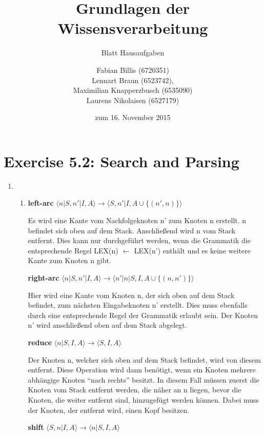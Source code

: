 \documentclass[a4paper]{scrartcl}
\title{Grundlagen der Wissensverarbeitung}
\subtitle{Blatt {\blattnr} Hausaufgaben}
\author{
    Fabian Billis (6720351) \\
    Lennart Braun (6523742), \\
    Maximilian Knapperzbusch (6535090) \\
    Laurens Nikolaisen (6527179) \\
}
\date{zum 16. November 2015}
\def \blattnr {5}
\begin{document}
\maketitle

\section*{Exercise \blattnr.2: Search and Parsing}

\begin{enumerate}
    \item
        \begin{enumerate}[label=(\alph*)]
            \item
            
            {
            
            \textbf{left-arc}   $\langle n|S,n'|I,A\rangle \rightarrow \langle S,n'|I,A \cup \{(n',n)\}\rangle$
            
            Es wird eine Kante vom Nachfolgeknoten n' zum Knoten n erstellt. n befindet sich oben auf dem Stack.
            Anschließend wird n vom Stack entfernt. Dies kann nur durchgeführt werden, wenn die Grammatik die entsprechende Regel LEX(n) $\leftarrow$ LEX(n') enthält und es keine weitere Kante zum Knoten n gibt. 
            
            \textbf{right-arc} $\langle n |S, n' | I, A \rangle \rightarrow \langle n'|n|S, I, A \cup \{(n, n')\}\rangle$ 
            
            
            Hier wird eine Kante vom Knoten n, der sich oben auf dem Stack befindet, zum nächsten Eingabeknoten n' erstellt.
            Dies muss ebenfalls durch eine entsprechende Regel der Grammatik erlaubt sein. Der Knoten n' wird anschließend oben auf dem Stack abgelegt.
            
            \textbf{reduce} $\langle n|S,I,A\rangle \rightarrow \langle S,I,A \rangle$
            
            Der Knoten n, welcher sich oben auf dem Stack befindet, wird von diesem entfernt. Diese Operation wird dann benötigt, wenn ein Knoten mehrere abhängige Knoten "`nach rechts"' besitzt. In diesem Fall müssen zuerst die Knoten vom Stack entfernt werden, die näher an n liegen, bevor die Knoten, die weiter entfernt sind, hinzugefügt werden können. Dabei muss der Knoten, der entfernt wird, einen Kopf besitzen.
            
            \textbf{shift} $\langle S,n|I,A\rangle \rightarrow \langle n|S,I,A \rangle$
            
}
\end{enumerate}
\end{enumerate}
\end{document}
